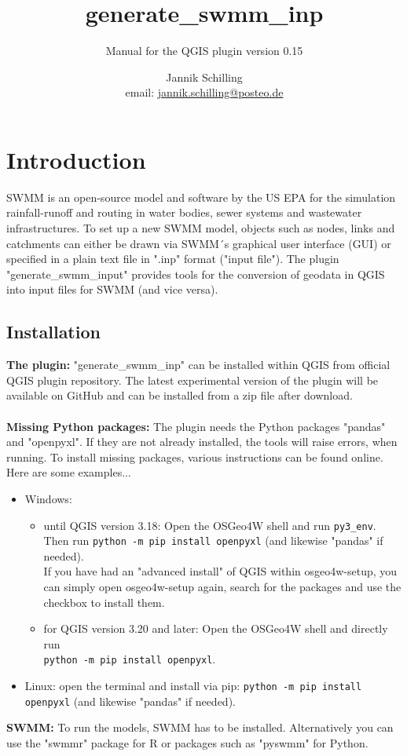 \documentclass[10pt,a4paper,oneside]{scrbook}
\title{generate\_swmm\_inp}
\subtitle{Manual for the QGIS plugin version 0.15}
\author{Jannik Schilling \\ email: \href{mailto:jannik.schilling@posteo.de}{jannik.schilling@posteo.de}}
\newcommand{\lil}[1]{\lstinline{#1}}
\begin{document}
\maketitle
\tableofcontents

\chapter{Introduction}
SWMM is an open-source model and software by the US EPA for the simulation rainfall-runoff and routing in water bodies, sewer systems and wastewater infrastructures. To set up a new SWMM model, objects such as nodes, links and catchments can either be drawn via SWMM´s graphical user interface (GUI) or specified in a plain text file in ".inp" format ("input file"). The plugin "generate\_swmm\_input" provides tools for the conversion of geodata in QGIS into input files for SWMM (and vice versa). \\
\section{Installation}
\textbf{The plugin:} "generate\_swmm\_inp" can be installed within QGIS from official QGIS plugin repository. The latest experimental version of the plugin will be available on GitHub and can be installed from a zip file after download. \\
\\
\textbf{Missing Python packages:} The plugin needs the Python packages "pandas" and "openpyxl". If they are not already installed, the tools will raise errors, when running. To install missing packages, various instructions can be found online. Here are some examples...
\begin{itemize}
	\item Windows:
	\begin{itemize}
		\item until QGIS version 3.18: Open the OSGeo4W shell and run \colorbox{mygray}{\lil{py3_env}}. 
		\\Then run \colorbox{mygray}{\lil{python -m pip install openpyxl}} (and likewise "pandas" if needed).
		\\If you have had an "advanced install" of QGIS within osgeo4w-setup, you can simply open osgeo4w-setup again, search for the packages and use the checkbox to install them.
		\item for QGIS version 3.20 and later: 
		Open the OSGeo4W shell and directly run\\
		\colorbox{mygray}{\lil{python -m pip install openpyxl}}.
	\end{itemize}
	\item Linux: open the terminal and install via pip: 
	\colorbox{mygray}{\lil{python -m pip install openpyxl}} (and likewise "pandas" if needed).
\end{itemize} 
\textbf{SWMM:} To run the models, SWMM has to be installed. Alternatively you can use the "swmmr" package for R or packages such as "pyswmm" for Python. \\
\end{document}
